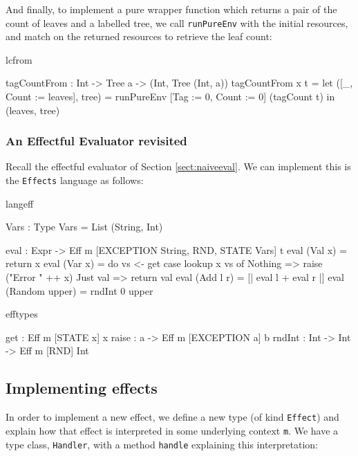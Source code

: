 \noindent
And finally, to implement a pure wrapper function which returns a pair of the
count of leaves and a labelled tree, we call \texttt{runPureEnv} with the
initial resources, and match on the returned resources to retrieve the leaf
count:

\begin{SaveVerbatim}{lcfrom}

tagCountFrom : Int -> Tree a -> (Int, Tree (Int, a))
tagCountFrom x t 
    = let ([_, Count := leaves], tree) =
       runPureEnv [Tag := 0, Count := 0] (tagCount t)
          in (leaves, tree)

\end{SaveVerbatim}

\subsubsection{An Effectful Evaluator revisited}

Recall the effectful evaluator of Section \ref{sect:naiveeval}. We can
implement this is the \texttt{Effects} language as follows:

\begin{SaveVerbatim}{langeff}

Vars : Type
Vars = List (String, Int)

eval : Expr -> 
       Eff m [EXCEPTION String, RND, STATE Vars] t
eval (Val x) = return x
eval (Var x) = 
    do vs <- get
       case lookup x vs of
            Nothing => raise ("Error " ++ x)
            Just val => return val
eval (Add l r) = [| eval l + eval r |]
eval (Random upper) = rndInt 0 upper

\end{SaveVerbatim}


\begin{SaveVerbatim}{efftypes}

get : Eff m [STATE x] x
raise : a -> Eff m [EXCEPTION a] b
rndInt : Int -> Int -> Eff m [RND] Int

\end{SaveVerbatim}


\subsection{Implementing effects}

In order to implement a new effect, we define a new type (of kind \texttt{Effect})
and explain how that effect is interpreted in some underlying context
\texttt{m}. We have a type class, \texttt{Handler}, with a method \texttt{handle}
explaining this interpretation:

